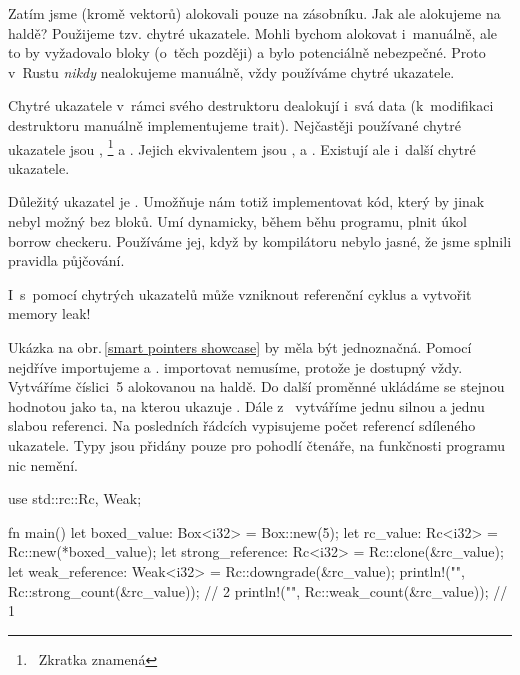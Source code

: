 \documentclass[main.tex]{subfiles}
\begin{document}

Zatím jsme (kromě vektorů) alokovali pouze na zásobníku. Jak ale alokujeme na haldě?
Použijeme tzv. chytré ukazatele. Mohli bychom alokovat i~manuálně, ale to by vyžadovalo
 bloky (o~těch později) a bylo potenciálně nebezpečné. Proto v~Rustu
\emph{nikdy} nealokujeme manuálně, vždy používáme chytré ukazatele.

Chytré ukazatele v~rámci svého destruktoru dealokují i~svá data (k~modifikaci destruktoru
manuálně implementujeme  trait). Nejčastěji používané chytré ukazatele jsou
, \footnote{~Zkratka znamená } a
. Jejich ekvivalentem jsou ,
 a . Existují ale i~další chytré
ukazatele. \cite[kapitola\,15]{thebook}

Důležitý ukazatel je . Umožňuje nám totiž implementovat kód, který by
jinak nebyl možný bez  bloků. Umí dynamicky, během běhu programu, plnit
úkol borrow checkeru. Používáme jej, když by kompilátoru nebylo jasné, že jsme splnili
pravidla půjčování.

I~s~pomocí chytrých ukazatelů může vzniknout referenční cyklus a vytvořit memory leak!

Ukázka na obr.\,\ref{smart pointers showcase} by měla být jednoznačná. Pomocí 
nejdříve importujeme  a .  importovat nemusíme,
protože je dostupný vždy. Vytváříme číslici~5 alokovanou na haldě. Do další proměnné
ukládáme  se stejnou hodnotou jako ta, na kterou ukazuje . Dále
z~ vytváříme jednu silnou a jednu slabou referenci. Na posledních řádcích
vypisujeme počet referencí sdíleného ukazatele. Typy jsou přidány pouze pro pohodlí
čtenáře, na funkčnosti programu nic nemění.

\obrazek
\begin{rustcode}
    use std::rc::{Rc, Weak};

    fn main() {
        let boxed_value: Box<i32> = Box::new(5);
        let rc_value: Rc<i32> = Rc::new(*boxed_value);
        let strong_reference: Rc<i32> = Rc::clone(&rc_value);
        let weak_reference: Weak<i32> = Rc::downgrade(&rc_value);
        println!("{}", Rc::strong_count(&rc_value)); // 2
        println!("{}", Rc::weak_count(&rc_value)); // 1
    }
\end{rustcode}
\end{document}
